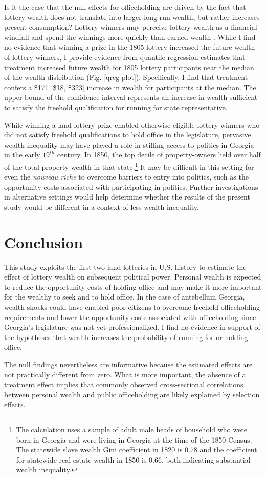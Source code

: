 Is it the case that the null effects for officeholding are driven by the fact that lottery wealth does not translate into larger long-run wealth, but rather increases present consumption? Lottery winners may perceive lottery wealth as a financial windfall and spend the winnings more quickly than earned wealth \citep{doherty2006}. While I find no evidence that winning a prize in the 1805 lottery increased the future wealth of lottery winners, I provide evidence from quantile regression estimates that treatment increased future wealth for 1805 lottery participants near the median of the wealth distribution (Fig. \ref{qreg-plot}). Specifically, I find that treatment confers a \$171 [\$18, \$323] increase in wealth for participants at the median. The upper bound of the confidence interval represents an increase in wealth sufficient to satisfy the freehold qualification for running for state representative. 

While winning a land lottery prize enabled otherwise eligible lottery winners who did not satisfy freehold qualifications to hold office in the legislature, pervasive wealth inequality may have played a role in stifling access to politics in Georgia in the early $19^{th}$ century. In 1850, the top decile of property-owners held over half of the total property wealth in that state.\footnote{The calculation uses a sample of adult male heads of household who were born in Georgia and were living in Georgia at the time of the 1850 Census. The statewide slave wealth Gini coefficient in 1820 is 0.78 and the coefficient for statewide real estate wealth in 1850 is 0.66, both indicating substantial wealth inequality.} It may be difficult in this setting for even the \textit{nouveau riche} to overcome barriers to entry into politics, such as the opportunity costs associated with participating in politics. Further investigations in alternative settings would help determine whether the results of the present study would be different in a context of less wealth inequality. 

\section{Conclusion} \label{conclusion} 

This study exploits the first two land lotteries in U.S. history to estimate the effect of lottery wealth on subsequent political power. Personal wealth is expected to reduce the opportunity costs of holding office and may make it more important for the wealthy to seek and to hold office. In the case of antebellum Georgia, wealth shocks could have enabled poor citizens to overcome freehold officeholding requirements and lower the opportunity costs associated with officeholding since Georgia's legislature was not yet professionalized. I find no evidence in support of the hypotheses that wealth increases the probability of running for or holding office. 

The null findings nevertheless are informative because the estimated effects are not practically different from zero. What is more important, the absence of a treatment effect implies that commonly observed cross-sectional correlations between personal wealth and public officeholding are likely explained by selection effects. 